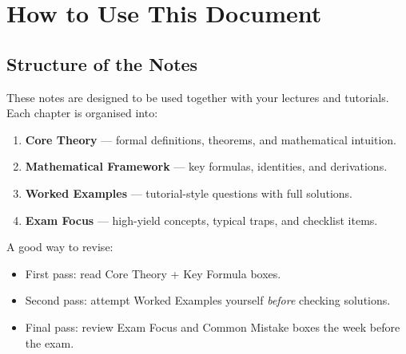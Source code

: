 \documentclass[12pt]{article}
\begin{document}
\section*{How to Use This Document}
\subsection*{Structure of the Notes}
These notes are designed to be used together with your lectures and tutorials. Each chapter is organised into:
\begin{enumerate}
\item \textbf{Core Theory} --- formal definitions, theorems, and mathematical intuition.
\item \textbf{Mathematical Framework} --- key formulas, identities, and derivations.
\item \textbf{Worked Examples} --- tutorial-style questions with full solutions.
\item \textbf{Exam Focus} --- high-yield concepts, typical traps, and checklist items.
\end{enumerate}

A good way to revise:
\begin{itemize}
\item First pass: read Core Theory + Key Formula boxes.
\item Second pass: attempt Worked Examples yourself \emph{before} checking solutions.
\item Final pass: review Exam Focus and Common Mistake boxes the week before the exam.
\end{itemize}
\end{document}
